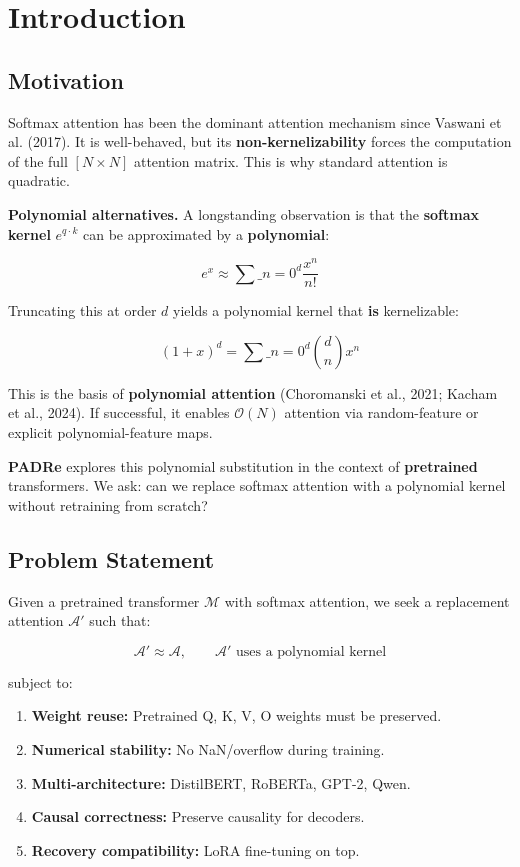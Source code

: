\section{Introduction}

\subsection{Motivation}

Softmax attention has been the dominant attention mechanism since 
Vaswani et al. (2017). It is well-behaved, but its \textbf{non-kernelizability} 
forces the computation of the full $[N \times N]$ attention matrix. This 
is why standard attention is quadratic.

\textbf{Polynomial alternatives.} A longstanding observation is that the 
\textbf{softmax kernel} $e^{q \cdot k}$ can be approximated by a \textbf{polynomial}:

\[
e^x \approx \sum\_{n=0}^{d} \frac{x^n}{n!}
\tag{1.1}
\]

Truncating this at order $d$ yields a polynomial kernel that \textbf{is} 
kernelizable:

\[
(1 + x)^d = \sum\_{n=0}^{d} \binom{d}{n} x^n
\tag{1.2}
\]

This is the basis of \textbf{polynomial attention} (Choromanski et al., 2021; 
Kacham et al., 2024). If successful, it enables $\mathcal{O}(N)$ attention 
via random-feature or explicit polynomial-feature maps.

\textbf{PADRe} explores this polynomial substitution in the context of \textbf{pretrained} 
transformers. We ask: can we replace softmax attention with a polynomial 
kernel without retraining from scratch?

\subsection{Problem Statement}

Given a pretrained transformer $\mathcal{M}$ with softmax attention, we 
seek a replacement attention $\mathcal{A}'$ such that:

\[
\mathcal{A}' \approx \mathcal{A}, \qquad
\mathcal{A}' \text{ uses a polynomial kernel}
\tag{1.3}
\]

subject to:

\begin{enumerate}
\item \textbf{Weight reuse:} Pretrained Q, K, V, O weights must be preserved.
\item \textbf{Numerical stability:} No NaN/overflow during training.
\item \textbf{Multi-architecture:} DistilBERT, RoBERTa, GPT-2, Qwen.
\item \textbf{Causal correctness:} Preserve causality for decoders.
\item \textbf{Recovery compatibility:} LoRA fine-tuning on top.

\end{enumerate}
